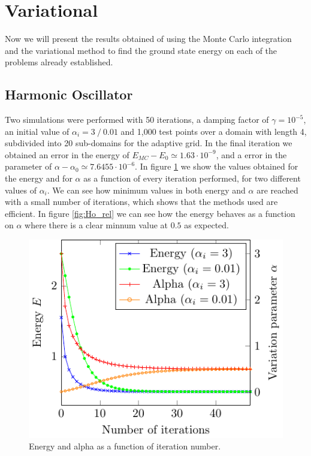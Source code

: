 
\section{Variational}
Now we will present the results obtained of using the Monte Carlo integration and the variational
method to find the ground state energy on each of the problems already established.

\subsection{Harmonic Oscillator}
Two simulations were performed with 50 iterations, a damping factor of $\gamma = 10^{-5}$, an initial value of $\alpha_i = 3~/~ 0.01$  and 1,000 test points over a domain with length 4, subdivided into 20 sub-domains for the adaptive grid. In the final iteration we obtained an  error in the energy of $E_{MC}-E_0 \simeq 1.63\cdot 10^{-9}$,
and a error in the parameter of $\alpha - \alpha_0 \simeq 7.6455\cdot 10^{-6}$. In figure \ref{fig:Ho_it}
we show the values obtained for the energy and for $\alpha$ as a function of every iteration performed, for two different values of $\alpha_i$. We can see how  minimum values in both energy and $\alpha$ are reached with a small number of iterations, which shows that the methods used are efficient. In figure \ref{fig:Ho_rel} we can see how the energy behaves as a function on $\alpha$ where there is a clear minnum value at $0.5$ as expected.
\begin{figure}
	\begin{center}
		\includegraphics[scale=0.9]{graphs/ho-e-alpha-iterations.pdf}
		\caption{
			Energy and alpha as a function of iteration number. %
			}
		\label{fig:Ho_it}
	\end{center}
\end{figure}
